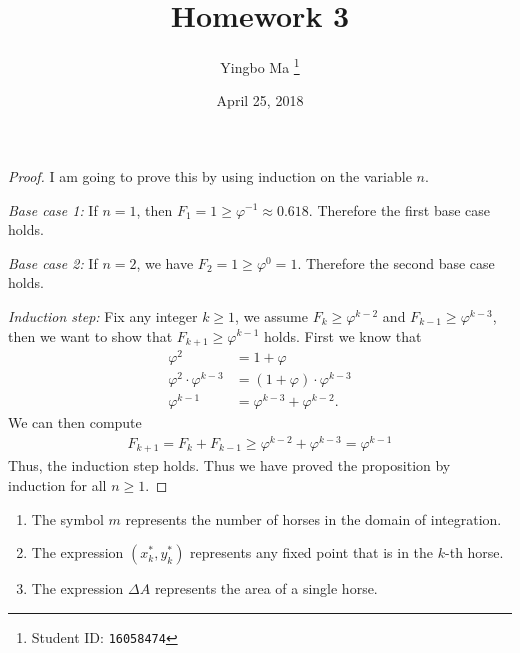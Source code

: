 \documentclass[8pt,twocolumn]{article}
\author{Yingbo Ma \thanks{Student ID: \tt{16058474}}}
\title{\vspace{-1.cm}Homework 3}
\date{April 25, 2018}
\begin{document}
\maketitle

\begin{Answer}[number=17]
\begin{proof}
  I am going to prove this by using induction on the variable $n$.

  \emph{Base case 1:} If $n=1$, then $F_1 = 1 \ge \varphi^{-1} \approx 0.618$.
  Therefore the first base case holds.

  \emph{Base case 2:} If $n=2$, we have $F_2 = 1 \ge \varphi^{0} = 1$.
  Therefore the second base case holds.

  \emph{Induction step:} Fix any integer $k\ge 1$, we assume $F_k\ge
  \varphi^{k-2}$ and $F_{k-1}\ge\varphi^{k-3}$, then we want to show that
  $F_{k+1} \ge \varphi^{k-1}$ holds. First
  we know that
  \begin{align*}
    \varphi^2 &= 1+\varphi \\
    \varphi^2\cdot\varphi^{k-3} &= (1+\varphi)\cdot\varphi^{k-3} \\
    \varphi^{k-1} &= \varphi^{k-3} + \varphi^{k-2}.
  \end{align*}
  We can then compute
  \begin{align*}
    F_{k+1} = F_k + F_{k-1} \ge \varphi^{k-2} + \varphi^{k-3} = \varphi^{k-1}
  \end{align*}
  Thus, the induction step holds. Thus we have proved the proposition by
  induction for all $n\ge 1$.
\end{proof}
\end{Answer}

\begin{Answer}[number=18]
  \begin{enumerate}
    \item The symbol $m$ represents the number of horses in the domain of
      integration.
    \item The expression $(x_k^*,y_k^*)$ represents any fixed point that is in
      the $k$-th horse.
    \item The expression $\Delta A$ represents the area of a single horse.
  \end{enumerate}
\end{Answer}
\end{document}
